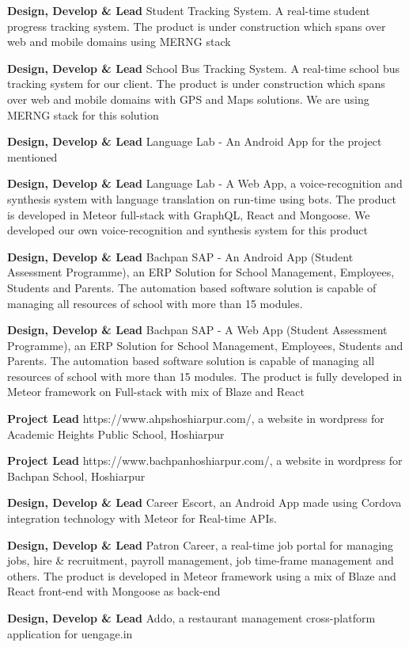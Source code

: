 \documentclass[margin,line]{res}
\begin{document}
\begin{resume}
\textbf{Design, Develop \& Lead} Student Tracking System. A real-time student progress tracking system. The product is under construction which spans over web and mobile domains using MERNG stack

\textbf{Design, Develop \& Lead} School Bus Tracking System. A real-time school bus tracking system for our client. The product is under construction which spans over web and mobile domains with GPS and Maps solutions. We are using MERNG stack for this solution

\textbf{Design, Develop \& Lead} Language Lab - An Android App for the project mentioned

\textbf{Design, Develop \& Lead} Language Lab - A Web App, a voice-recognition and synthesis system with language translation on run-time using bots. The product is developed in Meteor full-stack with GraphQL, React and Mongoose. We developed our own voice-recognition and synthesis system for this product

\textbf{Design, Develop \& Lead} Bachpan SAP - An Android App (Student Assessment Programme), an ERP Solution for School Management, Employees, Students and Parents. The automation based software solution is capable of managing all resources of school with more than 15 modules.

\textbf{Design, Develop \& Lead} Bachpan SAP - A Web App (Student Assessment Programme), an ERP Solution for School Management, Employees, Students and Parents. The automation based software solution is capable of managing all resources of school with more than 15 modules. The product is fully developed in Meteor framework on Full-stack with mix of Blaze and React

\textbf{Project Lead} https://www.ahpshoshiarpur.com/, a website in wordpress for Academic Heights Public School, Hoshiarpur

\textbf{Project Lead} https://www.bachpanhoshiarpur.com/, a website in wordpress for Bachpan School, Hoshiarpur

\textbf{Design, Develop \& Lead} Career Escort, an Android App made using Cordova integration technology with Meteor for Real-time APIs.

\textbf{Design, Develop \& Lead} Patron Career, a real-time job portal for managing jobs, hire \& recruitment, payroll management, job time-frame management and others. The product is developed in Meteor framework using a mix of Blaze and React front-end with Mongoose as back-end

\textbf{Design, Develop \& Lead} Addo, a restaurant management cross-platform application for uengage.in 


\end{resume}
\end{document}
